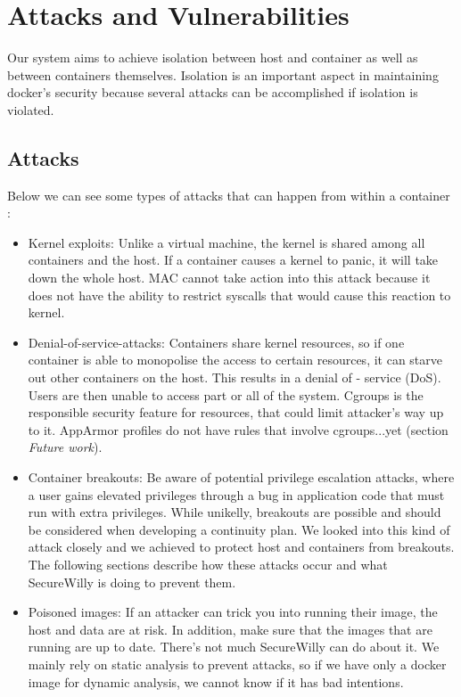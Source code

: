 \chapter{Attacks and Vulnerabilities}
Our system aims to achieve isolation between host and container as well as between containers themselves.
Isolation is an important aspect in maintaining docker's security because several attacks can be accomplished if isolation is violated. 

\section{Attacks}
Below we can see some types of attacks that can happen from within a container \cite{securityattacks}: 

\begin{itemize}
\item Kernel exploits: Unlike a virtual machine, the kernel is shared among all containers and the host. If a container causes a kernel to panic, it will take down the whole host.
MAC cannot take action into this attack because it does not have the ability to restrict syscalls that would cause this reaction to kernel.

\item Denial-of-service-attacks: Containers share kernel resources, so if one container is able to monopolise the access to certain resources, it can starve out other containers on the host. This results in a denial of - service (DoS). Users are then unable to access part or all of the system.
Cgroups is the responsible security feature for resources, that could limit attacker's way up to it. AppArmor profiles do not have rules that involve cgroups...yet (section \textit{Future work}).

\item Container breakouts: Be aware of potential privilege escalation attacks, where a user gains elevated privileges through a bug in application code that must run with extra privileges. While unikelly, breakouts are possible and should be considered  when developing a continuity plan.
We looked into this kind of attack closely and we achieved to protect host and containers from breakouts. The following sections describe how these attacks occur and what SecureWilly is doing to prevent them.

\item Poisoned images: If an attacker can trick you into running their image, the host and data are at risk. In addition, make sure that the images that are running are up to date.
There's not much SecureWilly can do about it. We mainly rely on static analysis to prevent attacks, so if we have only a docker image for dynamic analysis, we cannot know if it has bad intentions.


\end{itemize}
